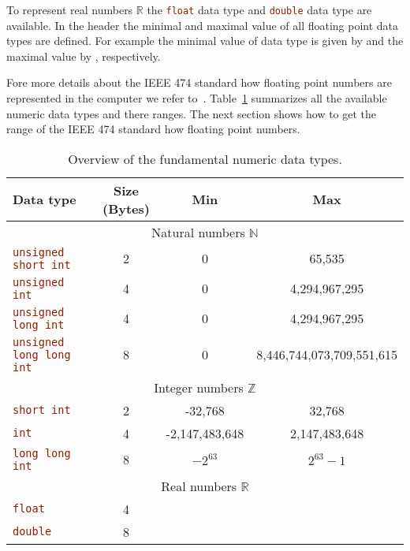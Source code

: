To represent real numbers $\mathbb{R}$ the \lstinline[language=C++]|float| data type and \lstinline[language=C++]|double| data type are available. In the  header the minimal and maximal value of all floating point data types are defined. For example the minimal value of  data type is given by  and the maximal value by , respectively. 

Fore more details about the IEEE 474 standard how floating point numbers are represented in the computer we refer to~\cite{4610935,goldberg1991every}. Table~\ref{chapter2:table:datatypes} summarizes all the available numeric data types and there ranges. The next section shows how to get the range of the IEEE 474 standard how floating point numbers.

\begin{table}[h]
\centering
\begin{tabular}{lccc}
\toprule
Data type & Size (Bytes) & Min & Max \\\midrule
\multicolumn{4}{c}{Natural numbers $\mathbb{N}$ }\\\midrule
\lstinline[language=C++]|unsigned short int| & 2 & 0 & 65,535  \\ 
\lstinline[language=C++]|unsigned int| & 4 & 0 & 4,294,967,295 \\ 
\lstinline[language=C++]|unsigned long int| & 4 & 0 & 4,294,967,295 \\ 
\lstinline[language=C++]|unsigned long long int| & 8 & 0 & 8,446,744,073,709,551,615 \\ \midrule
\multicolumn{4}{c}{Integer numbers $\mathbb{Z}$ }\\\midrule
\lstinline[language=C++]|short int| & 2 & -32,768 & 32,768 \\
\lstinline[language=C++]|int| & 4 & -2,147,483,648 & 2,147,483,648 \\
\lstinline[language=C++]|long long int| & 8 & $-2^{63}$ & $2^{63}-1$ \\\midrule
\multicolumn{4}{c}{Real numbers $\mathbb{R}$ }\\\midrule
\lstinline[language=C++]|float| & 4 &  &  \\
\lstinline[language=C++]|double| & 8 &  &  \\
\bottomrule
\end{tabular} 
\caption{Overview of the fundamental numeric data types.}
\label{chapter2:table:datatypes}
\end{table}

